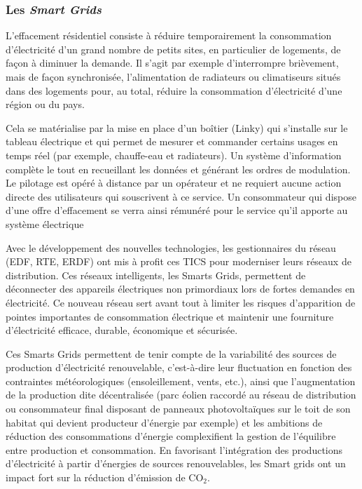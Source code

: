 \documentclass[10pt]{article}
\begin{document}
			
		\subsubsection{Les \emph{Smart Grids}}
		
			L'effacement résidentiel consiste à réduire temporairement la consommation d'électricité d'un grand nombre de petits sites, en particulier de logements, de façon à diminuer la demande. Il s'agit par exemple d'interrompre brièvement, mais de façon synchronisée, l'alimentation de radiateurs ou climatiseurs situés dans des logements pour, au total, réduire la consommation d'électricité d'une région ou du pays.
			
			Cela se matérialise par la mise en place d'un boîtier (Linky) qui s'installe sur le tableau électrique et qui permet de mesurer et commander certains usages en temps réel (par exemple, chauffe-eau et radiateurs). Un système d'information complète le tout en recueillant les données et générant les ordres de modulation. Le pilotage est opéré à distance par un opérateur et ne requiert aucune action directe des utilisateurs qui souscrivent à ce service. Un consommateur qui dispose d'une offre d'effacement se verra ainsi rémunéré pour le service qu'il apporte au système électrique
			
			Avec le développement des nouvelles technologies, les gestionnaires du réseau (EDF, RTE, ERDF) ont mis à profit ces TICS pour moderniser leurs réseaux de distribution. Ces réseaux intelligents, les Smarts Grids, permettent de déconnecter des appareils électriques non primordiaux lors de fortes demandes en électricité. Ce nouveau réseau sert avant tout à limiter les risques d'apparition de pointes importantes de consommation électrique et maintenir une fourniture d'électricité efficace, durable, économique et sécurisée.
			
			Ces Smarts Grids permettent de tenir compte de la variabilité des sources de production d'électricité renouvelable, c'est-à-dire leur fluctuation en fonction des contraintes météorologiques (ensoleillement, vents, etc.), ainsi que l'augmentation de la production dite décentralisée (parc éolien raccordé au réseau de distribution ou consommateur final disposant de panneaux photovoltaïques sur le toit de son habitat qui devient producteur d'énergie par exemple) et les ambitions de réduction des consommations d'énergie complexifient la gestion de l'équilibre entre production et consommation. En favorisant l'intégration des productions d'électricité à partir d'énergies de sources renouvelables, les Smart grids ont un impact fort sur la réduction d'émission de CO$_2$.
			
\end{document}
